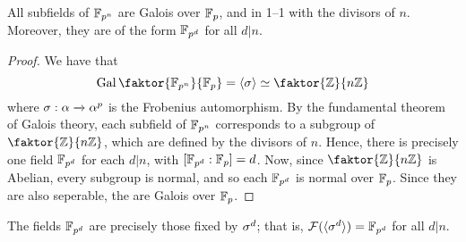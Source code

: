 \begin{corollary}
    All subfields of $\mathbb{F}_{p^n}$ are Galois over $\mathbb{F}_p$, and in 1--1
    with the divisors of $n$. Moreover, they are of the form $\mathbb{F}_{p^d}$ for all
    $d|n$.
\end{corollary}
\begin{proof}
    We have that
    \begin{equation*}
        \Gal{\faktor{\F_{p^n}}{\F_p}}=\langle \s \rangle \simeq
        \faktor{\Z}{n\Z}
    \end{equation*}
    where $\sigma:\alpha \xrightarrow{} \alpha^p$ is the Frobenius automorphism. By the
    fundamental theorem of Galois theory, each subfield of $\mathbb{F}_{p^n}$
    corresponds to a subgroup of $\faktor{\Z}{n\Z}$, which are defined by the
    divisors of $n$. Hence, there is precisely one field $\mathbb{F}_{p^d}$ for each
    $d|n$, with  $[\mathbb{F}_{p^d}:\mathbb{F}_p]=d$. Now, since $\faktor{\Z}{n\Z}$ is Abelian,
    every subgroup is normal, and so each $\mathbb{F}_{p^d}$ is normal over $\mathbb{F}_p$.
    Since they are also seperable, the are Galois over $\mathbb{F}_p$.
\end{proof}
\begin{corollary}
    The fields $\mathbb{F}_{p^d}$ are precisely those fixed by $\sigma^d$; that is,
    $\mathcal{F}(\langle \sigma^d \rangle)=\mathbb{F}_{p^d}$ for all $d|n$.
\end{corollary}
